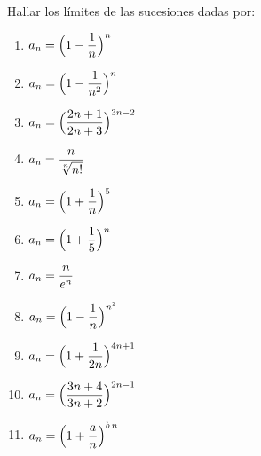 \item Hallar los límites de las sucesiones dadas por:
\label{ej:numero e} 

\begin{multicols}{2}
    \begin{enumerate}
    \item $\displaystyle a_n = \Big( 1-\frac1n \Big)^{n}$
    \item $\displaystyle a_n = \Big( 1-\frac1{n^ 2} \Big)^{n}$
    \item $\displaystyle a_n = \Big( \frac{2n+1}{2n+3} \Big)^{3n-2}$
    \item $\displaystyle a_n =  \frac{n}{\sqrt[n]{n!}} $
    \item $\displaystyle a_n = \Big( 1+\frac1n \Big)^{5}$
    \item $\displaystyle a_n = \Big( 1+\frac15 \Big)^{n}$
    \item $\displaystyle a_n = \frac{n}{e^ n}$
    \item $\displaystyle a_n = \Big( 1-\frac{1}{n}  \Big)^{n^2}$
    \item $\displaystyle a_n = \Big( 1+\frac1{2n} \Big)^{4n+1}$
    \item $\displaystyle a_n = \Big( \frac{3n
+4}{3n+2} \Big)^{2n-1}$
    \item\label{ej:eab}  $\displaystyle a_n = \Big( 1+\frac an \Big)^{b\,n}$
\end{enumerate}
\end{multicols}

